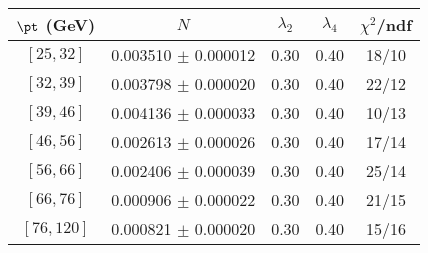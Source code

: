 \begin{tabular}{c||c|c|c|c}
$\pt$ (GeV) & $N$ & $\lambda_{2}$ & $\lambda_4$  & $\chi^2$/ndf  \\
\hline
$[25, 32]$ & 0.003510 $\pm$ 0.000012 & 0.30 & 0.40 & 18/10\\
$[32, 39]$ & 0.003798 $\pm$ 0.000020 & 0.30 & 0.40 & 22/12\\
$[39, 46]$ & 0.004136 $\pm$ 0.000033 & 0.30 & 0.40 & 10/13\\
$[46, 56]$ & 0.002613 $\pm$ 0.000026 & 0.30 & 0.40 & 17/14\\
$[56, 66]$ & 0.002406 $\pm$ 0.000039 & 0.30 & 0.40 & 25/14\\
$[66, 76]$ & 0.000906 $\pm$ 0.000022 & 0.30 & 0.40 & 21/15\\
$[76, 120]$ & 0.000821 $\pm$ 0.000020 & 0.30 & 0.40 & 15/16\\
\end{tabular}
